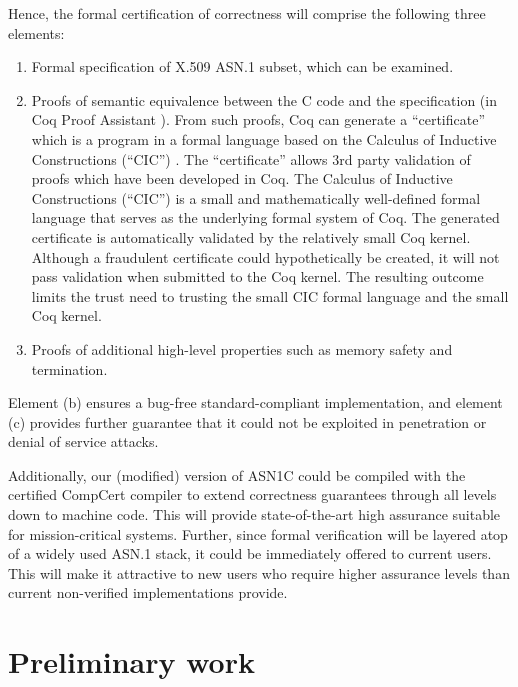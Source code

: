 \documentclass[acmsmall,nonacm]{acmart}
\begin{document}
Hence, the formal certification of correctness will comprise the following
three elements:

\begin{enumerate}[label=(\alph*)]

\item Formal specification of X.509 ASN.1 subset, which can be examined.

\item Proofs of semantic equivalence between the C code and the
  specification (in Coq Proof Assistant \cite{Coq}). From such
  proofs, Coq can generate a ``certificate'' which is a program in a
  formal language based on the Calculus of Inductive Constructions
  (``CIC'') \cite{CIC}. The ``certificate'' allows 3rd party
  validation of proofs which have been developed in Coq. The Calculus
  of Inductive Constructions (``CIC'') is a small and mathematically
  well-defined formal language that serves as the underlying formal
  system of Coq. The generated certificate is automatically validated
  by the relatively small Coq kernel. Although a fraudulent
  certificate could hypothetically be created, it will not pass
  validation when submitted to the Coq kernel. The resulting outcome
  limits the trust need to trusting the small CIC formal language and
  the small Coq kernel.

\item Proofs of additional high-level properties such as memory safety
  and termination.

\end{enumerate}
  

Element (b) ensures a bug-free standard-compliant implementation, and
element (c) provides further guarantee that it could not be exploited
in penetration or denial of service attacks.

Additionally, our (modified) version of ASN1C could be compiled with
the certified CompCert compiler \cite{CompCert} to extend correctness
guarantees through all levels down to machine code. This will provide state-of-the-art high
assurance suitable for mission-critical systems. Further, since formal
verification will be layered atop of a widely used ASN.1 stack, it
could be immediately offered to current users. This will make it attractive to new users who require higher
assurance levels than current non-verified implementations provide.

\section{Preliminary work}
\end{document}
